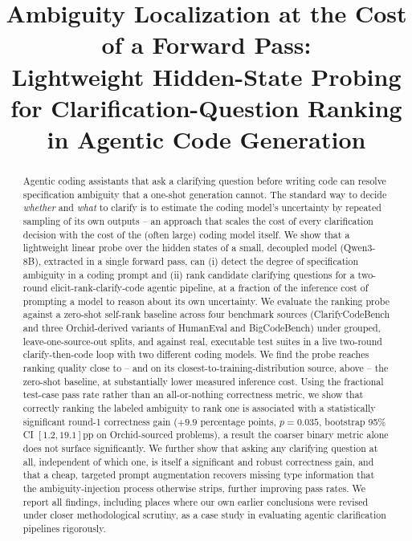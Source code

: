 \documentclass[conference]{IEEEtran}
\begin{document}
\title{Ambiguity Localization at the Cost of a Forward Pass:\\
Lightweight Hidden-State Probing for Clarification-Question Ranking\\
in Agentic Code Generation}

\author{
}

\maketitle

\begin{abstract}
Agentic coding assistants that ask a clarifying question before writing code
can resolve specification ambiguity that a one-shot generation cannot. The
standard way to decide \emph{whether} and \emph{what} to clarify is to
estimate the coding model's uncertainty by repeated sampling of its own
outputs -- an approach that scales the cost of every clarification decision
with the cost of the (often large) coding model itself. We show that a
lightweight linear probe over the hidden states of a small, decoupled model
(Qwen3-8B), extracted in a single forward pass, can (i) detect the degree of
specification ambiguity in a coding prompt and (ii) rank candidate
clarifying questions for a two-round elicit-rank-clarify-code agentic
pipeline, at a fraction of the inference cost of prompting a model to reason
about its own uncertainty. We evaluate the ranking probe against a zero-shot
self-rank baseline across four benchmark sources (ClarifyCodeBench and three
Orchid-derived variants of HumanEval and BigCodeBench) under grouped,
leave-one-source-out splits, and against real, executable test suites in a
live two-round clarify-then-code loop with two different coding models. We
find the probe reaches ranking quality close to -- and on its
closest-to-training-distribution source, above -- the zero-shot baseline, at
substantially lower measured inference cost. Using the fractional
test-case pass rate rather than an all-or-nothing correctness metric, we
show that correctly ranking the labeled ambiguity to rank one is associated
with a statistically significant round-1 correctness gain
($+9.9$ percentage points, $p=0.035$, bootstrap 95\% CI $[1.2, 19.1]$pp on
Orchid-sourced problems), a result the coarser binary metric alone does not
surface significantly. We further show that asking any clarifying question
at all, independent of which one, is itself a significant and robust
correctness gain, and that a cheap, targeted prompt augmentation recovers
missing type information that the ambiguity-injection process otherwise
strips, further improving pass rates. We report all findings, including
places where our own earlier conclusions were revised under closer
methodological scrutiny, as a case study in evaluating agentic clarification
pipelines rigorously.
\end{abstract}
\end{document}
